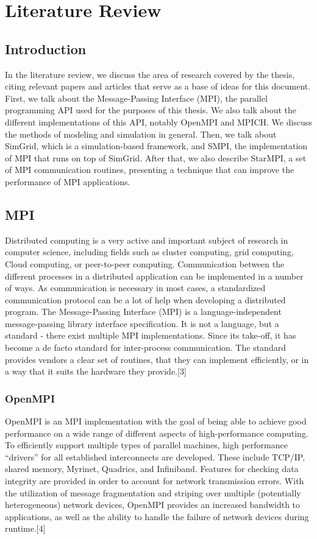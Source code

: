 
\chapter{Literature Review}
\label{Chapter2}

\section{Introduction}
In the literature review, we discuss the area of research covered by
the thesis, citing relevant papers and articles that serve as a base
of ideas for this document.\\
First, we talk about the Message-Passing Interface (MPI), the parallel
programming API used for the purposes of this thesis. We also talk
about the different implementations of this API, notably OpenMPI and
MPICH. We discuss the methods of modeling and simulation in general.
Then, we talk about SimGrid, which is a simulation-based
framework, and SMPI, the implementation of MPI that runs on top of
SimGrid. After that, we also describe StarMPI, a set of MPI
communication routines, presenting a technique that can improve the
performance of MPI applications.
\section{MPI}
Distributed computing is a very active and important subject of research
in computer science, including fields such as cluster computing, grid
computing, Cloud computing, or peer-to-peer computing. Communication
between the different processes in a distributed application can be
implemented in a number of ways. As communication is necessary in most
cases, a standardized communication protocol can be a lot of help when
developing a distributed program. The Message-Passing Interface (MPI)
is a language-independent message-passing library
interface specification. It is not a language, but a standard - there
exist multiple MPI implementations. Since its take-off, it has become
a de facto standard for inter-process communication. The standard
provides vendors a clear set of routines, that they can implement
efficiently, or in a way that it suits the hardware they provide.[3]
\subsection{OpenMPI}
OpenMPI is an MPI implementation with the goal of being able to
achieve good performance on a wide range of different aspects of
high-performance computing. To efficiently support multiple types of
parallel machines, high performance “drivers” for all established
interconnects are developed. These include TCP/IP, shared memory,
Myrinet, Quadrics, and Infiniband. Features for checking data
integrity are provided in order to account for network transmission
errors. With the utilization of message fragmentation and striping
over multiple (potentially heterogeneous) network devices, OpenMPI
provides an increased bandwidth to applications, as well as the
ability to handle the failure of network devices during runtime.[4]
